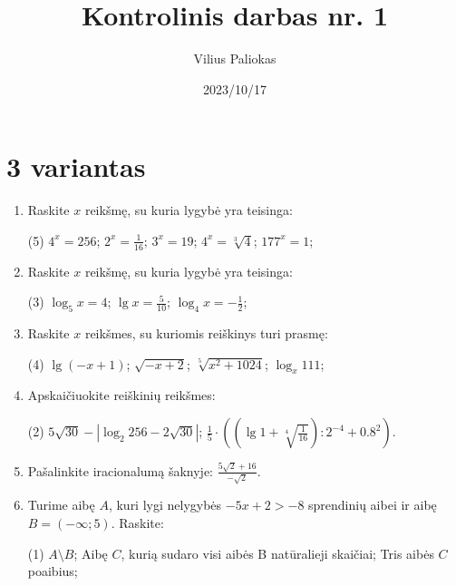 \documentclass[a4paper]{article}
\title{Kontrolinis darbas nr. 1}
\author{Vilius Paliokas}
\date{2023/10/17}
\begin{document}
\thispagestyle{empty}
\section*{3 variantas}

\begin{enumerate}
      \item Raskite $x$ reikšmę, su kuria lygybė yra teisinga:

            \begin{tasks}[item-format={\normalfont}, after-item-skip=4mm](5)
                  \task $4^{x}=256$;
                  \task $2^{x}=\frac{1}{16}$;
                  \task $3^{x}=19$;
                  \task $4^{x}=\sqrt[3]{4}$;
                  \task $177^{x}=1$;
            \end{tasks}

      \item Raskite $x$ reikšmę, su kuria lygybė yra teisinga:
            \begin{tasks}[item-format={\normalfont}, after-item-skip=4mm](3)
                  \task $\log_{5} x=4$;
                  \task $\lg x=\frac{5}{10}$;
                  \task $\log_{4} x=-\frac{1}{2}$;
            \end{tasks}

      \item Raskite $x$ reikšmes, su kuriomis reiškinys turi prasmę:
            \begin{tasks}[item-format={\normalfont}, after-item-skip=4mm](4)
                  \task $\lg (-x+1)$;
                  \task $\sqrt{-x+2}$;
                  \task $\sqrt[5]{x^{2}+1024}$;
                  \task $\log_{x}111$;
            \end{tasks}

      \item Apskaičiuokite reiškinių reikšmes:
            \begin{tasks}[item-format={\normalfont}, after-item-skip=10mm](2)
                  \task $5\sqrt{30}-\left|\log_{2}256-2\sqrt{30}\right|$;
                  \task $\frac{1}{5} \cdot
                        ((\lg1+\sqrt[4]{\frac{1}{16}}):2^{-4}+0.8^2)$.
            \end{tasks}
      \item Pašalinkite iracionalumą šaknyje: $\frac{5\sqrt{2}+16}{-\sqrt{2}}$.
      \item Turime aibę $A$, kuri lygi nelygybės $-5x+2>-8$ sprendinių aibei ir
            aibę $B=(-\infty;5)$. Raskite:
            \begin{tasks}[item-format={\normalfont}, after-item-skip=2mm](1)
                  \task $A \setminus B$;
                  \task Aibę $C$, kurią sudaro visi aibės B natūralieji
                  skaičiai;
                  \task Tris aibės $C$ poaibius;
            \end{tasks}

\end{enumerate}
\end{document}
